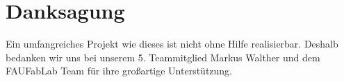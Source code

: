 \section{Danksagung}

Ein umfangreiches Projekt wie dieses ist nicht ohne Hilfe realisierbar. Deshalb bedanken wir uns bei unserem 5. Teammitglied Markus Walther und dem FAUFabLab Team für ihre großartige Unterstützung.




